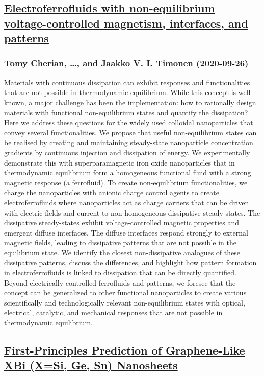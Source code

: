 \subsection*{\href{http://arxiv.org/abs/2009.12563v1}{Electroferrofluids with non-equilibrium voltage-controlled magnetism,  interfaces, and patterns}}
\subsubsection*{Tomy Cherian, \dots, and Jaakko V. I. Timonen (2020-09-26)}
Materials with continuous dissipation can exhibit responses and
functionalities that are not possible in thermodynamic equilibrium. While this
concept is well-known, a major challenge has been the implementation: how to
rationally design materials with functional non-equilibrium states and quantify
the dissipation? Here we address these questions for the widely used colloidal
nanoparticles that convey several functionalities. We propose that useful
non-equilibrium states can be realised by creating and maintaining steady-state
nanoparticle concentration gradients by continuous injection and dissipation of
energy. We experimentally demonstrate this with superparamagnetic iron oxide
nanoparticles that in thermodynamic equilibrium form a homogeneous functional
fluid with a strong magnetic response (a ferrofluid). To create non-equilibrium
functionalities, we charge the nanoparticles with anionic charge control agents
to create electroferrofluids where nanoparticles act as charge carriers that
can be driven with electric fields and current to non-homogeneous dissipative
steady-states. The dissipative steady-states exhibit voltage-controlled
magnetic properties and emergent diffuse interfaces. The diffuse interfaces
respond strongly to external magnetic fields, leading to dissipative patterns
that are not possible in the equilibrium state. We identify the closest
non-dissipative analogues of these dissipative patterns, discuss the
differences, and highlight how pattern formation in electroferrofluids is
linked to dissipation that can be directly quantified. Beyond electrically
controlled ferrofluids and patterns, we foresee that the concept can be
generalized to other functional nanoparticles to create various scientifically
and technologically relevant non-equilibrium states with optical, electrical,
catalytic, and mechanical responses that are not possible in thermodynamic
equilibrium.

\subsection*{\href{http://arxiv.org/abs/2009.12561v1}{First-Principles Prediction of Graphene-Like XBi (X=Si, Ge, Sn)  Nanosheets}}
